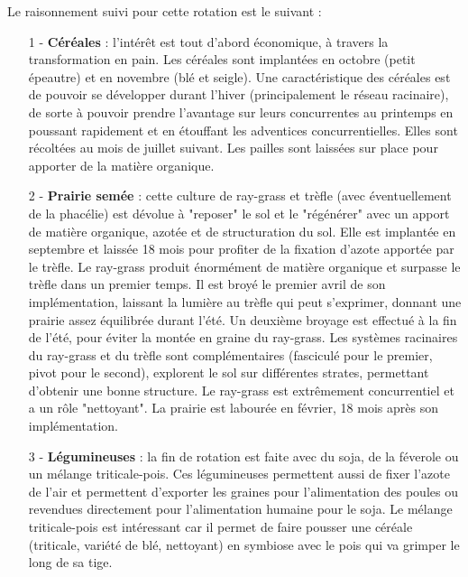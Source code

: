 \documentclass{article}
\begin{document}
Le raisonnement suivi pour cette rotation est le suivant : 
\begin{itemize}

	\item[1 - ] \textbf{Céréales} : l'intérêt est tout d'abord économique, à travers la transformation en pain. Les céréales sont implantées en octobre (petit épeautre) et en novembre (blé et seigle). Une caractéristique des céréales est de pouvoir se développer durant l'hiver (principalement le réseau racinaire), de sorte à pouvoir prendre l'avantage sur leurs concurrentes au printemps en poussant rapidement et en étouffant les adventices concurrentielles. Elles sont récoltées au mois de juillet suivant. Les pailles sont laissées sur place pour apporter de la matière organique.
	
	\item[2 - ] \textbf{Prairie semée} : cette culture de ray-grass et trèfle (avec éventuellement de la phacélie) est dévolue à "reposer" le sol et le "régénérer" avec un apport de matière organique, azotée et de structuration du sol. Elle est implantée en septembre et laissée 18 mois pour profiter de la fixation d'azote apportée par le trèfle. Le ray-grass produit énormément de matière organique et surpasse le trèfle dans un premier temps. Il est broyé le premier avril de son implémentation, laissant la lumière au trèfle qui peut s'exprimer, donnant une prairie assez équilibrée durant l'été. Un deuxième broyage est effectué à la fin de l'été, pour éviter la montée en graine du ray-grass. Les systèmes racinaires du ray-grass et du trèfle sont complémentaires (fasciculé pour le premier, pivot pour le second), explorent le sol sur différentes strates, permettant d'obtenir une bonne structure. Le ray-grass est extrêmement concurrentiel et a un rôle "nettoyant". La prairie est labourée en février, 18 mois après son implémentation.
	
	\item[3 - ] \textbf{Légumineuses} : la fin de rotation est faite avec du soja, de la féverole ou un mélange triticale-pois. Ces légumineuses permettent aussi de fixer l'azote de l'air et permettent d'exporter les graines pour l'alimentation des poules ou revendues directement pour l'alimentation humaine pour le soja. Le mélange triticale-pois est intéressant car il permet de faire pousser une céréale (triticale, variété de blé, nettoyant) en symbiose avec le pois qui va grimper le long de sa tige.

\end{itemize}
\end{document}
